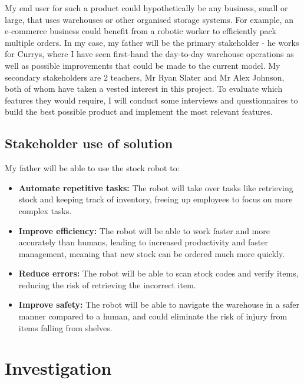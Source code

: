 My end user for such a product could hypothetically be any business, small or large, that uses warehouses or other organised storage systems. For example, an e-commerce business could benefit from a robotic worker to efficiently pack multiple orders.
\textbf{\newline}
\newline
In my case, my father will be the primary stakeholder - he works for Currys, where I have seen first-hand the day-to-day warehouse operations as well as possible improvements that could be made to the current model. My secondary stakeholders are 2 teachers, Mr Ryan Slater and Mr Alex Johnson, both of whom have taken a vested interest in this project.
\newline
To evaluate which features they would require, I will conduct some interviews and questionnaires to build the best possible product and implement the most relevant features.


\subsection{Stakeholder use of solution}

My father will be able to use the stock robot to:

\begin{itemize}
    \item \textbf{Automate repetitive tasks:} The robot will take over tasks like retrieving stock and keeping track of inventory, freeing up employees to focus on more complex tasks.
    \item \textbf{Improve efficiency:} The robot will be able to work faster and more accurately than humans, leading to increased productivity and faster management, meaning that new stock can be ordered much more quickly.
    \item \textbf{Reduce errors:} The robot will be able to scan stock codes and verify items, reducing the risk of retrieving the incorrect item.
    \item \textbf{Improve safety:} The robot will be able to navigate the warehouse in a safer manner compared to a human, and could eliminate the risk of injury from items falling from shelves.
\end{itemize}


\newpage

\section{Investigation}

